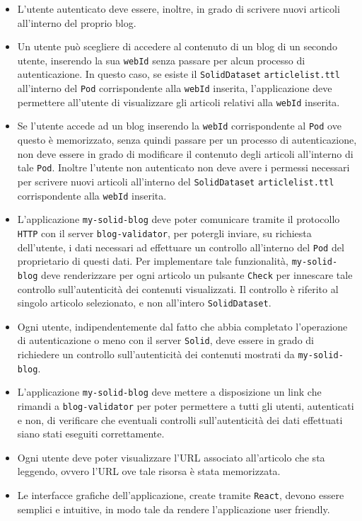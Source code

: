 \begin{itemize}
	\item L'utente autenticato deve essere, inoltre, in grado di scrivere nuovi articoli all'interno del proprio blog.
	\item Un utente può scegliere di accedere al contenuto di un blog di un secondo utente, inserendo la sua {\tt webId} senza passare per alcun processo di autenticazione. In questo caso, se esiste il {\tt SolidDataset} {\tt articlelist.ttl} all'interno del {\tt Pod} corrispondente alla {\tt webId} inserita, l'applicazione deve permettere all'utente di visualizzare gli articoli relativi alla {\tt webId} inserita.
	\item Se l'utente accede ad un blog inserendo la {\tt webId} corrispondente al {\tt Pod} ove questo è memorizzato, senza quindi passare per un processo di autenticazione, non deve essere in grado di modificare il contenuto degli articoli all'interno di tale {\tt Pod}. Inoltre l'utente non autenticato non deve avere i permessi necessari per scrivere nuovi articoli all'interno del {\tt SolidDataset} {\tt articlelist.ttl} corrispondente alla {\tt webId} inserita.
	\item L'applicazione {\tt my-solid-blog} deve poter comunicare tramite il protocollo {\tt HTTP} con il server {\tt blog-validator}, per potergli inviare, su richiesta dell'utente, i dati necessari ad effettuare un controllo all'interno del {\tt Pod} del proprietario di questi dati. Per implementare tale funzionalità, {\tt my-solid-blog} deve renderizzare per ogni articolo un pulsante {\tt Check} per innescare tale controllo sull'autenticità dei contenuti visualizzati. Il controllo è riferito al singolo articolo selezionato, e non all'intero {\tt SolidDataset}.
	\item Ogni utente, indipendentemente dal fatto che abbia completato l'operazione di autenticazione o meno con il server {\tt Solid}, deve essere in grado di richiedere un controllo sull'autenticità dei contenuti mostrati da {\tt my-solid-blog}.
	\item L'applicazione {\tt my-solid-blog} deve mettere a disposizione un link che rimandi a {\tt blog-validator} per poter permettere a tutti gli utenti, autenticati e non, di verificare che eventuali controlli sull'autenticità dei dati effettuati siano stati eseguiti correttamente.
	\item Ogni utente deve poter visualizzare l'URL associato all'articolo che sta leggendo, ovvero l'URL ove tale risorsa è stata memorizzata.
	\item Le interfacce grafiche dell'applicazione, create tramite {\tt React}, devono essere semplici e intuitive, in modo tale da rendere l'applicazione user friendly.
\end{itemize}

